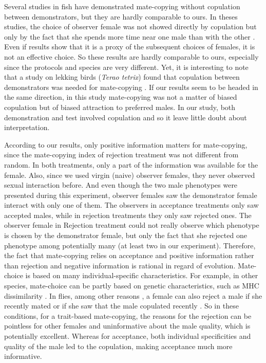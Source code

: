 \documentclass[a4paper, 12pt]{article}
\begin{document}
Several studies in fish have demonstrated mate-copying without copulation between demonstrators, but they are hardly comparable to ours.
In theses studies, the choice of observer female was not showed directly by copulation but only by the fact that she spends more time near one male than with the other \parencite{dugatkin_reversal_1992,galef_mate-choice_1998}. Even if \textcite{bischoff_tail_1985} results show that it is a proxy of the subsequent choices of females, it is not an effective choice. So these results are hardly comparable to ours, especially since the protocols and species are very different.
Yet, it is interesting to note that a study on lekking birds (\textit{Terao tetrix}) found that copulation between demonstrators was needed for mate-copying \parencite{hoglund_mate_1995}. If our results seem to be headed in the same direction, in this study mate-copying was not a matter of biased copulation but of biased attraction to preferred males. In our study, both demonstration and test involved copulation and so it leave little doubt about interpretation.

According to our results, only positive information matters for mate-copying, since the mate-copying index of rejection treatment was not different from random.
In both treatments, only a part of the information was available for the female.
Also, since we used virgin (naive) observer females, they never observed sexual interaction before.
And even though the two male phenotypes were presented during this experiment, observer females saw the demonstrator female interact with only one of them.
The observers in acceptance treatments only saw accepted males, while in rejection treatments they only saw rejected ones.
The observer female in Rejection treatment could not really observe which phenotype is chosen by the demonstrator female, but only the fact that she rejected one phenotype among potentially many (at least two in our experiment).
Therefore, the fact that mate-copying relies on acceptance and positive information rather than rejection and negative information is rational in regard of evolution.
Mate-choice is based on many individual-specific characteristics. For example, in other species, mate-choice can be partly based on genetic characteristics, such as MHC dissimilarity \parencite{wedekind_mhc_1995, landry_good_2001}. In flies, among other reasons \parencite{tennant_causes_2014}, a female can also reject a male if she recently mated \parencite{chapman_sex_2003} or if she saw that the male copulated recently \parencite{loyau_when_2012}.
So in these conditions, for a trait-based mate-copying, the reasons for the rejection can be pointless for other females and uninformative about the male quality, which is potentially excellent.
Whereas for acceptance, both individual specificities and quality of the male led to the copulation, making acceptance much more informative.
\end{document}
